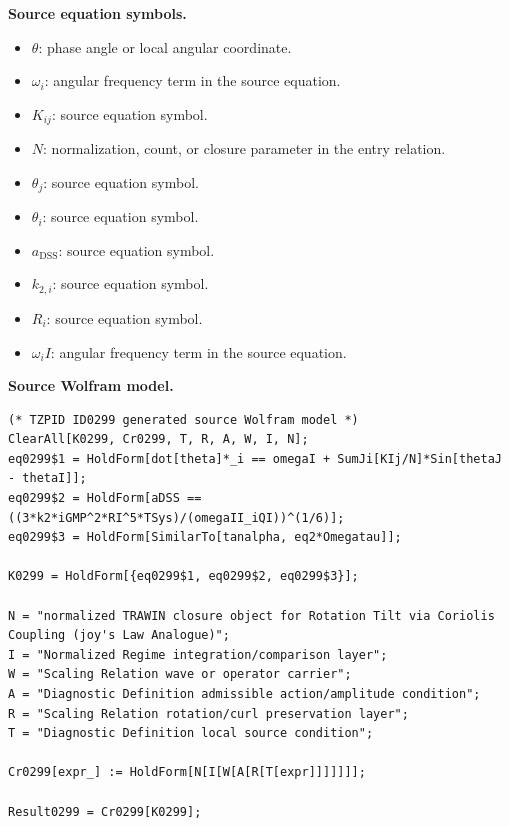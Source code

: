 \begin{minipage}[t]{0.49\linewidth}
\begingroup
\small
\raggedright
\textbf{Source equation symbols.}\par
\begin{itemize}[leftmargin=1.35em,itemsep=1pt,topsep=1pt,parsep=0pt]
    \item $\theta$: phase angle or local angular coordinate.
    \item $\omega_i$: angular frequency term in the source equation.
    \item $K_{ij}$: source equation symbol.
    \item $N$: normalization, count, or closure parameter in the entry relation.
    \item $\theta_j$: source equation symbol.
    \item $\theta_i$: source equation symbol.
    \item $a_{\mathrm{DSS}}$: source equation symbol.
    \item $k_{2,i}$: source equation symbol.
    \item $R_i$: source equation symbol.
    \item $\omega_iI$: angular frequency term in the source equation.
\end{itemize}
\endgroup
\end{minipage}\hfill
\begin{minipage}[t]{0.47\linewidth}
\begingroup
\scriptsize
\raggedright
\textbf{Source Wolfram model.}\par
\begin{Verbatim}[fontsize=\tiny,breaklines=true,breakanywhere=true]
(* TZPID ID0299 generated source Wolfram model *)
ClearAll[K0299, Cr0299, T, R, A, W, I, N];
eq0299$1 = HoldForm[dot[theta]*_i == omegaI + SumJi[KIj/N]*Sin[thetaJ - thetaI]];
eq0299$2 = HoldForm[aDSS == ((3*k2*iGMP^2*RI^5*TSys)/(omegaII_iQI))^(1/6)];
eq0299$3 = HoldForm[SimilarTo[tanalpha, eq2*Omegatau]];

K0299 = HoldForm[{eq0299$1, eq0299$2, eq0299$3}];

N = "normalized TRAWIN closure object for Rotation Tilt via Coriolis Coupling (joy's Law Analogue)";
I = "Normalized Regime integration/comparison layer";
W = "Scaling Relation wave or operator carrier";
A = "Diagnostic Definition admissible action/amplitude condition";
R = "Scaling Relation rotation/curl preservation layer";
T = "Diagnostic Definition local source condition";

Cr0299[expr_] := HoldForm[N[I[W[A[R[T[expr]]]]]]];

Result0299 = Cr0299[K0299];
\end{Verbatim}
\endgroup
\end{minipage}


